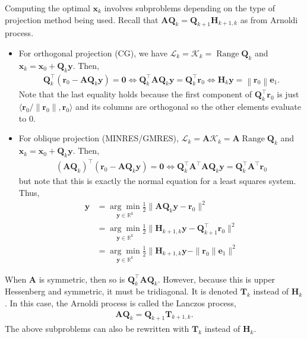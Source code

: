 \documentclass[12pt,a4paper]{article} %
\DeclareMathOperator{\Range}{Range}
\begin{document}
\newpage
 Computing the optimal $\bm x_k$ involves subproblems 
depending on the type of projection method being used.
Recall that $\mathbf A \mathbf Q_k = \mathbf Q_{k+1} \mathbf H_{k+1,k}$ as from 
Arnoldi process.
\begin{itemize}
    \item For orthogonal projection (CG), we have $\mathcal L_k = \mathcal K_k = \Range \mathbf Q_k$ and 
    $\bm x_k = \bm x_0 + \mathbf Q_k \bm y$. Then, 
    \begin{align*}
        \mathbf{Q}_{k}^{\top}\left(\bm{r}_{0}-\mathbf{A} \mathbf{Q}_{k} \bm{y}\right)=\mathbf{0} \Longleftrightarrow \mathbf{Q}_{k}^{\top} \mathbf{A} \mathbf{Q}_{k} \bm{y}=\mathbf{Q}_{k}^{\top} \bm{r}_{0} \Longleftrightarrow \mathbf{H}_{k} \bm{y}=\left\|\bm{r}_{0}\right\| \bm{e}_{1}.
    \end{align*}
    Note that the last equality holds because the first component
     of $\mathbf Q_k^\top \bm r_0$  is just $\langle \bm r_0 / \| \bm r_0 \|, \bm r_0\rangle$
    and its columns are orthogonal so the other elements evaluate to 0.
    \item For oblique projection (MINRES/GMRES), 
    $\mathcal L_k = \mathbf A\mathcal K_k = \mathbf A\Range \mathbf Q_k$ 
    and $\bm x_k = \bm x_0 + \mathbf Q_k \bm y$. Then, 
    \begin{align*}
        (\mathbf A \mathbf Q_k)^\top (\bm{r}_{0}-\mathbf{A} \mathbf{Q}_{k} \bm{y}) = \bm 0 \iff \mathbf Q_k^\top \mathbf A^\top \mathbf A \mathbf Q_k \bm y = \mathbf Q_k^\top \mathbf A^\top \bm r_0
    \end{align*}
    but note that this is exactly the normal equation for a least squares system. Thus, 
    \begin{align*}
        \bm y &= \underset{\bm y \in \mathbb R^k}{\arg \min} \frac{1}{2} \| \mathbf A \mathbf Q_k \bm y - \bm r_0 \|^2 \\ 
        &= \underset{\bm y \in \mathbb R^k}{\arg \min} \frac{1}{2} \| \mathbf H_{k+1,k} \bm y - \mathbf Q_{k+1}^\top\bm r_0 \|^2 \\ 
        &= \underset{\bm y \in \mathbb R^k}{\arg \min} \frac{1}{2} \Big\| \mathbf H_{k+1,k} \bm y - \|\bm r_0\| \bm e_1 \Big\|^2 
    \end{align*}
\end{itemize}
When $\mathbf A$ is symmetric, then so is $\mathbf Q_k^\top \mathbf A \mathbf Q_k$.
However, because this is upper Hessenberg and symmetric, it must be tridiagonal. 
It is denoted $\mathbf T_k$ instead of $\mathbf H_k$. In this case, the Arnoldi 
process is called the Lanczos process,
\begin{align*}
    \mathbf A \mathbf Q_{k} = \mathbf Q_{k+1} \mathbf T_{k+1,k}.
\end{align*}
The above subproblems can also  be rewritten with  $\mathbf T_k$ instead of $\mathbf H_k$.
\end{document}
